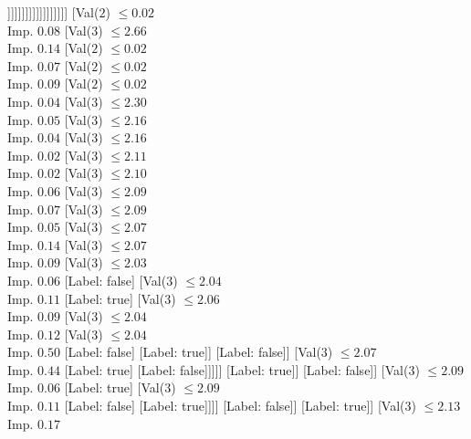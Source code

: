 \documentclass[margin=10pt]{standalone}
\begin{document}
\begin{forest}
																					]]]]]]]]]]]]]]]]]
				[Val($2$) $ \leq 0.02$ \\ Imp. $0.08$
					[Val($3$) $ \leq 2.66$ \\ Imp. $0.14$
						[Val($2$) $ \leq 0.02$ \\ Imp. $0.07$
							[Val($2$) $ \leq 0.02$ \\ Imp. $0.09$
								[Val($2$) $ \leq 0.02$ \\ Imp. $0.04$
									[Val($3$) $ \leq 2.30$ \\ Imp. $0.05$
										[Val($3$) $ \leq 2.16$ \\ Imp. $0.04$
											[Val($3$) $ \leq 2.16$ \\ Imp. $0.02$
												[Val($3$) $ \leq 2.11$ \\ Imp. $0.02$
													[Val($3$) $ \leq 2.10$ \\ Imp. $0.06$
														[Val($3$) $ \leq 2.09$ \\ Imp. $0.07$
															[Val($3$) $ \leq 2.09$ \\ Imp. $0.05$
																[Val($3$) $ \leq 2.07$ \\ Imp. $0.14$
																	[Val($3$) $ \leq 2.07$ \\ Imp. $0.09$
																		[Val($3$) $ \leq 2.03$ \\ Imp. $0.06$
																			[Label: false]
																			[Val($3$) $ \leq 2.04$ \\ Imp. $0.11$
																				[Label: true]
																				[Val($3$) $ \leq 2.06$ \\ Imp. $0.09$
																					[Val($3$) $ \leq 2.04$ \\ Imp. $0.12$
																						[Val($3$) $ \leq 2.04$ \\ Imp. $0.50$
																							[Label: false]
																							[Label: true]]
																						[Label: false]]
																					[Val($3$) $ \leq 2.07$ \\ Imp. $0.44$
																						[Label: true]
																						[Label: false]]]]]
																		[Label: true]]
																	[Label: false]]
																[Val($3$) $ \leq 2.09$ \\ Imp. $0.06$
																	[Label: true]
																	[Val($3$) $ \leq 2.09$ \\ Imp. $0.11$
																		[Label: false]
																		[Label: true]]]]
															[Label: false]]
														[Label: true]]
													[Val($3$) $ \leq 2.13$ \\ Imp. $0.17$

\end{forest}
\end{document}
